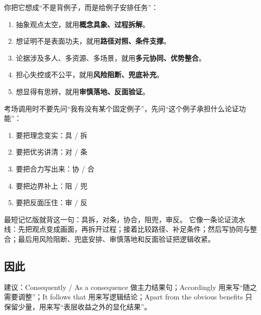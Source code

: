 ﻿\documentclass[lang=cn,11pt]{elegantbook}
\begin{document}
\begin{note}
你把它想成“不是背例子，而是给例子安排任务”：

\begin{enumerate}
  \item 抽象观点太空，就用\textbf{概念具象、过程拆解}。
  \item 想证明不是表面功夫，就用\textbf{路径对照、条件支撑}。
  \item 论据涉及多人、多资源、多场景，就用\textbf{多元协同、优势整合}。
  \item 担心失控或不公平，就用\textbf{风险阻断、兜底补充}。
  \item 想显得有思辨，就用\textbf{审慎落地、反面验证}。
\end{enumerate}

考场调用时不要先问“我有没有某个固定例子”，先问“这个例子承担什么论证功能”：

\begin{enumerate}
  \item 要把理念变实：具 / 拆
  \item 要把优劣讲清：对 / 条
  \item 要把合力写出来：协 / 合
  \item 要把边界补上：阻 / 兜
  \item 要把反面压住：审 / 反
\end{enumerate}

最短记忆版就背这一句：具拆，对条，协合，阻兜，审反。
它像一条论证流水线：先把观点变成画面，再拆开过程；接着比较路径、补足条件；然后写协同与整合；最后用风险阻断、兜底安排、审慎落地和反面验证把逻辑收紧。
\end{note}

\subsection{因此}
建议：Consequently / As a consequence 做主力结果句；Accordingly 用来写“随之需要调整”；It follows that 用来写逻辑结论；Apart from the obvious benefits 只保留少量，用来写“表层收益之外的显化结果”。
\end{document}
